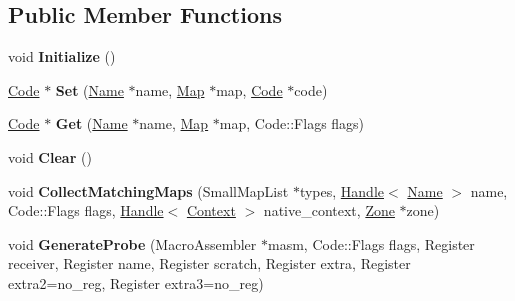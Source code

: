 \subsection*{Public Member Functions}
\begin{DoxyCompactItemize}
\item 
\hypertarget{classv8_1_1internal_1_1_stub_cache_a1d7461d9541a76fea7335451d844449b}{}void {\bfseries Initialize} ()\label{classv8_1_1internal_1_1_stub_cache_a1d7461d9541a76fea7335451d844449b}

\item 
\hypertarget{classv8_1_1internal_1_1_stub_cache_ade482f9122cb2bff3b0136f3e4cc313b}{}\hyperlink{classv8_1_1internal_1_1_code}{Code} $\ast$ {\bfseries Set} (\hyperlink{classv8_1_1internal_1_1_name}{Name} $\ast$name, \hyperlink{classv8_1_1internal_1_1_map}{Map} $\ast$map, \hyperlink{classv8_1_1internal_1_1_code}{Code} $\ast$code)\label{classv8_1_1internal_1_1_stub_cache_ade482f9122cb2bff3b0136f3e4cc313b}

\item 
\hypertarget{classv8_1_1internal_1_1_stub_cache_a42b3c283ccc57467f9f1cd00b43d42f4}{}\hyperlink{classv8_1_1internal_1_1_code}{Code} $\ast$ {\bfseries Get} (\hyperlink{classv8_1_1internal_1_1_name}{Name} $\ast$name, \hyperlink{classv8_1_1internal_1_1_map}{Map} $\ast$map, Code\+::\+Flags flags)\label{classv8_1_1internal_1_1_stub_cache_a42b3c283ccc57467f9f1cd00b43d42f4}

\item 
\hypertarget{classv8_1_1internal_1_1_stub_cache_ab9c691287872be2c5d6dacb76b7635b4}{}void {\bfseries Clear} ()\label{classv8_1_1internal_1_1_stub_cache_ab9c691287872be2c5d6dacb76b7635b4}

\item 
\hypertarget{classv8_1_1internal_1_1_stub_cache_ae127fb4575c4d6dad0c436fec0a68081}{}void {\bfseries Collect\+Matching\+Maps} (Small\+Map\+List $\ast$types, \hyperlink{classv8_1_1internal_1_1_handle}{Handle}$<$ \hyperlink{classv8_1_1internal_1_1_name}{Name} $>$ name, Code\+::\+Flags flags, \hyperlink{classv8_1_1internal_1_1_handle}{Handle}$<$ \hyperlink{classv8_1_1internal_1_1_context}{Context} $>$ native\+\_\+context, \hyperlink{classv8_1_1internal_1_1_zone}{Zone} $\ast$zone)\label{classv8_1_1internal_1_1_stub_cache_ae127fb4575c4d6dad0c436fec0a68081}

\item 
\hypertarget{classv8_1_1internal_1_1_stub_cache_a62e032c5711076900d25b3a7704bd8d7}{}void {\bfseries Generate\+Probe} (Macro\+Assembler $\ast$masm, Code\+::\+Flags flags, Register receiver, Register name, Register scratch, Register extra, Register extra2=no\+\_\+reg, Register extra3=no\+\_\+reg)\label{classv8_1_1internal_1_1_stub_cache_a62e032c5711076900d25b3a7704bd8d7}


\end{DoxyCompactItemize}
